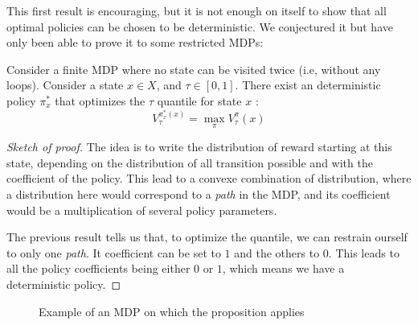 This first result is encouraging, but it is not enough on itself to show that all optimal policies can be chosen to be deterministic. We conjectured it but have only been able to prove it to some restricted MDPs:

\begin{proposition}
    Consider a finite MDP where no state can be visited twice (i.e, without any loops). Consider a state $x \in X$, and $\tau \in [0,1]$. There exist an deterministic policy $\pi^{*}_x$ that optimizes the $\tau$ quantile for state $x$ :
    \[ V_\tau^{\pi^{*}_x(x)} = \max_\pi V_\tau^\pi(x)\]
\end{proposition}
\begin{proof}[Sketch of proof]
    The idea is to write the distribution of reward starting at this state, depending on the distribution of all transition possible and with the coefficient of the policy. This lead to a convexe combination of distribution, where a distribution here would correspond to a \emph{path} in the MDP, and its coefficient would be a multiplication of several policy parameters.

    The previous result tells us that, to optimize the quantile, we can restrain ourself to only one \emph{path}. It coefficient can be set to $1$ and the others to $0$. This leads to all the policy coefficients being either $0$ or $1$, which means we have a deterministic policy.
\end{proof}

\begin{figure}[!ht]
    \centering
    \caption{Example of an MDP on which the proposition applies}
\end{figure}

